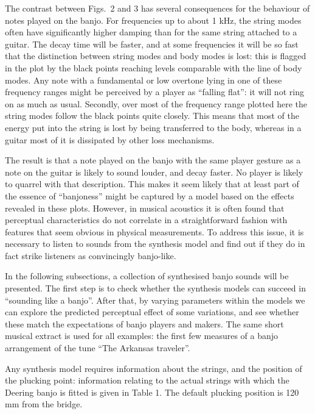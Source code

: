   The contrast between Figs.\ 2 and 3 has several consequences for the 
  behaviour of notes played on the banjo. For frequencies up to about 1 kHz, 
  the string modes often have significantly higher damping than for the same 
  string attached to a guitar. The decay time will be faster, and at some 
  frequencies it will be so fast that the distinction between string modes and 
  body modes is lost: this is flagged in the plot by the black points reaching 
  levels comparable with the line of body modes. Any note with a fundamental or 
  low overtone lying in one of these frequency ranges might be perceived by a 
  player as ``falling flat'': it will not ring on as much as usual. Secondly, 
  over most of the frequency range plotted here the string modes follow the 
  black points quite closely. This means that most of the energy put into the 
  string is lost by being transferred to the body, whereas in a guitar most of 
  it is dissipated by other loss mechanisms. 

  The result is that a note played on the banjo with the same player gesture as 
  a note on the guitar is likely to sound louder, and decay faster. No player 
  is likely to quarrel with that description. This makes it seem likely that at 
  least part of the essence of ``banjoness'' might be captured by a model based 
  on the effects revealed in these plots. However, in musical acoustics it is 
  often found that perceptual characteristics do not correlate in a 
  straightforward fashion with features that seem obvious in physical 
  measurements. To address this issue, it is necessary to listen to sounds from 
  the synthesis model and find out if they do in fact strike listeners as 
  convincingly banjo-like. 


  In the following subsections, a collection of synthesised banjo sounds will 
  be presented. The first step is to check whether the synthesis models can 
  succeed in ``sounding like a banjo''. After that, by varying parameters 
  within the models we can explore the predicted perceptual effect of some 
  variations, and see whether these match the expectations of banjo players and 
  makers. The same short musical extract is used for all examples: the first 
  few measures of a banjo arrangement of the tune ``The Arkansas traveler''. 

  Any synthesis model requires information about the strings, and the position 
  of the plucking point: information relating to the actual strings with which 
  the Deering banjo is fitted is given in Table 1. The default plucking 
  position is 120 mm from the bridge. 

